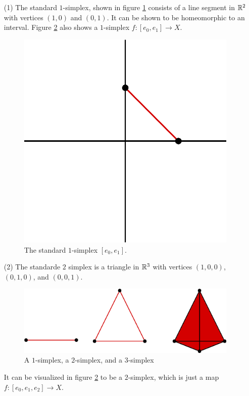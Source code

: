 \begin{example}\label{example_1.12}
    \begin{enumerate}
        \item[(1)] The standard $1$-simplex, shown in figure \ref{figure_1.7}
            consists of a line segment in $\mathbb{R}^2$ with vertices $(1,0)$ and $(0,1)$.
            It can be shown to be homeomorphic to an interval. Figure
            \ref{figure_1.8} also shows a $1$-simplex  $f:[e_0,e_1]
            \xrightarrow{} X$.
            \begin{figure}[h]
                \centering
                \includegraphics[scale=0.5]{Figures/Chapter1/standard_1_simplex.eps}
                \caption{The standard $1$-simplex  $[e_0,e_1]$.}
                \label{figure_1.7}
            \end{figure}

        \item[(2)] The standarde $2$ simplex is a triangle in  $\mathbb{R}^3$ with
            vertices  $(1,0,0)$, $(0,1,0)$, and $(0,0,1)$.
            \begin{figure}[h]
                \centering
                \includegraphics[scale=0.5]{Figures/Chapter1/simplices.eps}
                \caption{A $1$-simplex, a  $2$-simplex, and a  $3$-simplex}
                \label{figure_1.8}
            \end{figure}
            It can be visualized in figure \ref{figure_1.8} to be a $2$-simplex,
            which is just a map  $f:[e_0,e_1,e_2] \xrightarrow{} X$.


\end{enumerate}
\end{example}
